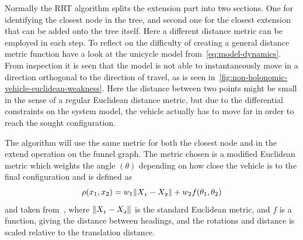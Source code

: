 Normally the \ac{RRT} algorithm splits the extension part into two sections. One
for identifying the closest node in the tree, and second one for the closest
extension that can be added onto the tree itself. Here a different distance
metric can be employed in each step. To reflect on the difficulty of creating a
general distance metric function have a look at the unicycle model
from~\eqref{eq:model-dynamics}. From inspection it is seen that the model is not
able to instantaneously move in a direction orthogonal to the direction of
travel, as is seen in~\ref{fig:non-holonomic-vehicle-euclidean-weakness}. Here
the distance between two points might be small in the sense of a regular
Euclidean distance metric, but due to the differential constraints on the system
model, the vehicle actually has to move far in order to reach the sought
configuration.

The \rrtfunnel{} algorithm will use the same metric for both the closest node
and in the extend operation on the funnel graph. The metric chosen is a modified
Euclidean metric which weights the angle \((\theta)\) depending on how close the
vehicle is to the final configuration and is defined as
\[
  \rho(x_{1},x_{2}) = w_{1}\lVert\mathnormal{X_{1}} - \mathnormal{X_{2}}\rVert +
  w_{2}f(\theta_1,\theta_2)
\]
and taken from~\cite{kuffnerEffectiveSamplingDistance2004}, where
\(\lVert\mathnormal{X_{1}} - \mathnormal{X_{2}}\rVert\) is the standard Euclidean
metric, and \(f\) is a function, giving the distance between headings, and the
rotations and distance is scaled relative to the translation distance.

